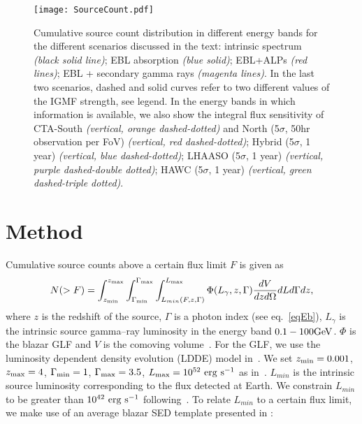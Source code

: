 \documentclass[final,5p]{elsarticle}
\begin{document}
\begin{figure*}[!htb]
  \centering
\texttt{[image: SourceCount.pdf]} 
\caption{Cumulative source count distribution in different energy bands for the different scenarios discussed in the text: intrinsic spectrum \textit{(black solid line)}; EBL absorption \textit{(blue solid)}; EBL+ALPs \textit{(red lines)}; EBL + secondary gamma rays \textit{(magenta lines)}. In the last two scenarios, dashed and solid curves refer to two different values of the IGMF strength, see legend. In the energy bands in which information is available, we also show the integral flux sensitivity of CTA-South \textit{(vertical, orange dashed-dotted)} and North (5$\sigma$, 50hr observation per FoV) \textit{(vertical, red dashed-dotted)}; Hybrid (5$\sigma$, 1 year) \textit{(vertical, blue dashed-dotted)}; LHAASO (5$\sigma$, 1 year) \textit{(vertical, purple dashed-double dotted)}; HAWC (5$\sigma$, 1 year) \textit{(vertical, green dashed-triple dotted)}.}
\label{figCumulativeCount}
\end{figure*}


\section{Method}\label{sec:Method}
Cumulative source counts above a certain flux limit $F$ is given as 
\begin{equation}
\label{eqSourceCount}
N(>F) = 
\int_{z_{\rm min}}^{z_{\rm max}} \int_{\Gamma_{\rm min}}^{\Gamma_{\rm max}}\int_{L_{min}(F,z,\Gamma)}^{L_{\rm max}} \Phi(L_{\gamma},z,\Gamma) \frac{dV}{dzd\Omega}dL d\Gamma dz,
\end{equation}
where $z$ is the redshift of the source, $\Gamma$ is a photon index (see eq.~\ref{eqEb}), $L_{\gamma}$ is the intrinsic source gamma--ray luminosity in the energy band $0.1-100 \rm GeV$. $\Phi$ is the blazar GLF and $V$ is the comoving volume~\cite{CosmographyReview}. For the GLF, we use the luminosity dependent density evolution (LDDE) model in~\cite{Ajello2015}. We set $z_{\rm min}=0.001$, $z_{\rm max}=4$, $\Gamma_{\rm min}=1$, $\Gamma_{\rm max}=3.5$, $L_{\rm max}=10^{52} \ {\rm erg\ s^{-1}}$ as in~\cite{Ajello2015}. $L_{min}$ is the intrinsic source luminosity corresponding to the flux detected at Earth. We constrain $L_{min}$ to be greater than $10^{42} \ {\rm erg\ s^{-1}}$ following~\cite{Ajello2015}. 
To relate $L_{min}$ to a certain flux limit, we make use of an average blazar SED template presented in \cite{Ajello2015}:
\end{document}
